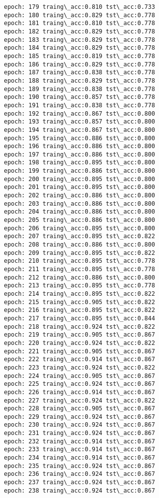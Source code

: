 \documentclass[11pt]{article}
\begin{document}
\begin{Verbatim}[commandchars=\\\{\}]
epoch: 179 traing\_acc:0.810 tst\_acc:0.733
epoch: 180 traing\_acc:0.829 tst\_acc:0.778
epoch: 181 traing\_acc:0.810 tst\_acc:0.778
epoch: 182 traing\_acc:0.829 tst\_acc:0.778
epoch: 183 traing\_acc:0.829 tst\_acc:0.778
epoch: 184 traing\_acc:0.829 tst\_acc:0.778
epoch: 185 traing\_acc:0.819 tst\_acc:0.778
epoch: 186 traing\_acc:0.829 tst\_acc:0.778
epoch: 187 traing\_acc:0.838 tst\_acc:0.778
epoch: 188 traing\_acc:0.829 tst\_acc:0.778
epoch: 189 traing\_acc:0.838 tst\_acc:0.778
epoch: 190 traing\_acc:0.857 tst\_acc:0.778
epoch: 191 traing\_acc:0.838 tst\_acc:0.778
epoch: 192 traing\_acc:0.867 tst\_acc:0.800
epoch: 193 traing\_acc:0.857 tst\_acc:0.800
epoch: 194 traing\_acc:0.867 tst\_acc:0.800
epoch: 195 traing\_acc:0.886 tst\_acc:0.800
epoch: 196 traing\_acc:0.886 tst\_acc:0.800
epoch: 197 traing\_acc:0.886 tst\_acc:0.800
epoch: 198 traing\_acc:0.895 tst\_acc:0.800
epoch: 199 traing\_acc:0.886 tst\_acc:0.800
epoch: 200 traing\_acc:0.895 tst\_acc:0.800
epoch: 201 traing\_acc:0.895 tst\_acc:0.800
epoch: 202 traing\_acc:0.886 tst\_acc:0.800
epoch: 203 traing\_acc:0.886 tst\_acc:0.800
epoch: 204 traing\_acc:0.886 tst\_acc:0.800
epoch: 205 traing\_acc:0.886 tst\_acc:0.800
epoch: 206 traing\_acc:0.895 tst\_acc:0.800
epoch: 207 traing\_acc:0.895 tst\_acc:0.822
epoch: 208 traing\_acc:0.886 tst\_acc:0.800
epoch: 209 traing\_acc:0.895 tst\_acc:0.822
epoch: 210 traing\_acc:0.895 tst\_acc:0.778
epoch: 211 traing\_acc:0.895 tst\_acc:0.778
epoch: 212 traing\_acc:0.886 tst\_acc:0.800
epoch: 213 traing\_acc:0.895 tst\_acc:0.778
epoch: 214 traing\_acc:0.895 tst\_acc:0.822
epoch: 215 traing\_acc:0.905 tst\_acc:0.822
epoch: 216 traing\_acc:0.895 tst\_acc:0.822
epoch: 217 traing\_acc:0.895 tst\_acc:0.844
epoch: 218 traing\_acc:0.924 tst\_acc:0.822
epoch: 219 traing\_acc:0.905 tst\_acc:0.867
epoch: 220 traing\_acc:0.924 tst\_acc:0.822
epoch: 221 traing\_acc:0.905 tst\_acc:0.867
epoch: 222 traing\_acc:0.914 tst\_acc:0.867
epoch: 223 traing\_acc:0.924 tst\_acc:0.822
epoch: 224 traing\_acc:0.905 tst\_acc:0.867
epoch: 225 traing\_acc:0.924 tst\_acc:0.867
epoch: 226 traing\_acc:0.914 tst\_acc:0.867
epoch: 227 traing\_acc:0.924 tst\_acc:0.822
epoch: 228 traing\_acc:0.905 tst\_acc:0.867
epoch: 229 traing\_acc:0.924 tst\_acc:0.867
epoch: 230 traing\_acc:0.924 tst\_acc:0.867
epoch: 231 traing\_acc:0.924 tst\_acc:0.867
epoch: 232 traing\_acc:0.914 tst\_acc:0.867
epoch: 233 traing\_acc:0.914 tst\_acc:0.867
epoch: 234 traing\_acc:0.914 tst\_acc:0.867
epoch: 235 traing\_acc:0.924 tst\_acc:0.867
epoch: 236 traing\_acc:0.924 tst\_acc:0.867
epoch: 237 traing\_acc:0.924 tst\_acc:0.867
epoch: 238 traing\_acc:0.924 tst\_acc:0.867

\end{Verbatim}
\end{document}
